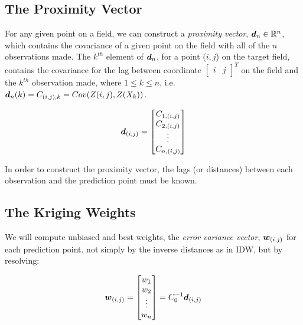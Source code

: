 \documentclass[11pt]{ucthesis}
\newcommand{\vect}[1]{{\it{\boldsymbol{#1}}}}
\begin{document}
\subsection{The Proximity Vector}
For any given point on a field, we can construct a \textit{proximity vector}, $\vect{d}_n \in \mathbb{R}^n$, which contains the covariance of a given point on the field with all of the $n$ observations made. The $k^{th}$ element of $\vect{d}_n$, for a point ($i,j$) on the target field, contains the covariance for the lag between coordinate $\begin{bmatrix} i & j \end{bmatrix}^{T}$ on the field and the $k^{th}$ observation made, where $1 \leq k \leq n$, i.e. $\vect{d}_n(k) = C_{(i,j), k} = Cov(Z(i,j), Z(X_k))$. 

\begin{equation}
    \vect{d}_{(i,j)} = \begin{bmatrix} C_{1,(i,j)} \\
                        C_{2,(i,j)} \\
                         \vdots \\
                        C_{n,(i,j)} \\
        \end{bmatrix}
    \label{eq:covvarmat}
\end{equation}

In order to construct the proximity vector, the lags (or distances) between each observation and the prediction point must be known.

\subsection{The Kriging Weights}
We will compute unbiased and best weights, the \textit{error variance vector}, $\vect{w}_{(i,j)}$ for each prediction point. not simply by the inverse distances as in IDW, but by resolving:

\begin{equation}
    \vect{w}_{(i,j)} = \begin{bmatrix} w_1 \\
                        w_2 \\
                         \vdots \\
                        w_n \\
        \end{bmatrix} = C_0^{-1}\vect{d}_{(i,j)}
    \label{eq:krigweights}
\end{equation}
\end{document}
